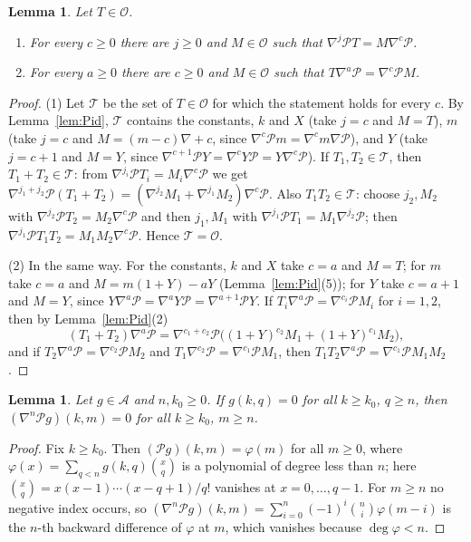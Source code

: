\documentclass[11pt]{amsart}
\newtheorem{lemma}[theorem]{Lemma}
\theoremstyle{definition}
\newcommand{\cO}{\mathcal{O}}
\begin{document}
\begin{lemma}\label{lem:transport}
Let $T\in\cO$.
\begin{enumerate}
\item For every $c\ge0$ there are $j\ge0$ and $M\in\cO$ such that $\nabla^j\mathcal PT=M\nabla^c\mathcal P$.
\item For every $a\ge0$ there are $c\ge0$ and $M\in\cO$ such that $T\nabla^a\mathcal P=\nabla^c\mathcal PM$.
\end{enumerate}
\end{lemma}

\begin{proof}
(1) Let $\mathcal T$ be the set of $T\in\cO$ for which the statement holds for every $c$. By Lemma~\ref{lem:Pid}, $\mathcal T$ contains the constants, $k$ and $X$ (take $j=c$ and $M=T$), $m$ (take $j=c$ and $M=(m-c)\nabla+c$, since $\nabla^c\mathcal Pm=\nabla^cm\nabla\mathcal P$), and $Y$ (take $j=c+1$ and $M=Y$, since $\nabla^{c+1}\mathcal PY=\nabla^cY\mathcal P=Y\nabla^c\mathcal P$). If $T_1,T_2\in\mathcal T$, then $T_1+T_2\in\mathcal T$: from $\nabla^{j_i}\mathcal PT_i=M_i\nabla^c\mathcal P$ we get $\nabla^{j_1+j_2}\mathcal P(T_1+T_2)=(\nabla^{j_2}M_1+\nabla^{j_1}M_2)\nabla^c\mathcal P$. Also $T_1T_2\in\mathcal T$: choose $j_2,M_2$ with $\nabla^{j_2}\mathcal PT_2=M_2\nabla^c\mathcal P$ and then $j_1,M_1$ with $\nabla^{j_1}\mathcal PT_1=M_1\nabla^{j_2}\mathcal P$; then $\nabla^{j_1}\mathcal PT_1T_2=M_1M_2\nabla^c\mathcal P$. Hence $\mathcal T=\cO$.

(2) In the same way. For the constants, $k$ and $X$ take $c=a$ and $M=T$; for $m$ take $c=a$ and $M=m(1+Y)-aY$ (Lemma~\ref{lem:Pid}(5)); for $Y$ take $c=a+1$ and $M=Y$, since $Y\nabla^a\mathcal P=\nabla^aY\mathcal P=\nabla^{a+1}\mathcal PY$. If $T_i\nabla^a\mathcal P=\nabla^{c_i}\mathcal PM_i$ for $i=1,2$, then by Lemma~\ref{lem:Pid}(2)
\[
  (T_1+T_2)\nabla^a\mathcal P=\nabla^{c_1+c_2}\mathcal P\bigl((1+Y)^{c_2}M_1+(1+Y)^{c_1}M_2\bigr),
\]
and if $T_2\nabla^a\mathcal P=\nabla^{c_2}\mathcal PM_2$ and $T_1\nabla^{c_2}\mathcal P=\nabla^{c_1}\mathcal PM_1$, then $T_1T_2\nabla^a\mathcal P=\nabla^{c_1}\mathcal PM_1M_2$.
\end{proof}

\begin{lemma}\label{lem:boundary}
Let $g\in\mathcal A$ and $n,k_0\ge0$. If $g(k,q)=0$ for all $k\ge k_0$, $q\ge n$, then $(\nabla^n\mathcal Pg)(k,m)=0$ for all $k\ge k_0$, $m\ge n$.
\end{lemma}

\begin{proof}
Fix $k\ge k_0$. Then $(\mathcal Pg)(k,m)=\varphi(m)$ for all $m\ge0$, where $\varphi(x)=\sum_{q<n}g(k,q)\binom{x}{q}$ is a polynomial of degree less than $n$; here $\binom{x}{q}=x(x-1)\cdots(x-q+1)/q!$ vanishes at $x=0,\dots,q-1$. For $m\ge n$ no negative index occurs, so $(\nabla^n\mathcal Pg)(k,m)=\sum_{i=0}^{n}(-1)^i\binom{n}{i}\varphi(m-i)$ is the $n$-th backward difference of $\varphi$ at $m$, which vanishes because $\deg\varphi<n$.
\end{proof}
\end{document}

